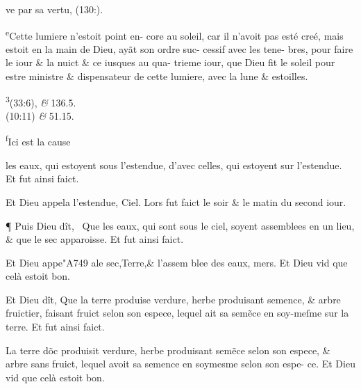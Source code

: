 \documentclass[twocolumn,paper=a4,pagesize=pdftex,12pt,headinclude=on]{scrbook}
\newcommand{\fakenote}[3][\space]{%
   \par\noindent#1\textsuperscript#2\justifying#3
}
\newcounter{verse}
\newcommand{\bverse}{%
  \addtocounter{verse}{1}
  \theverse\quad
}
\begin{document}
{{ ve par sa vertu, \linebreak
 (130:).}
   \fakenote{e}{Cette lumiere \linebreak
 n'estoit point en- \linebreak
 core au soleil, car \linebreak
 il n'avoit pas esté \linebreak
 creé, mais estoit en \linebreak
 la main de Dieu, \linebreak
 ay\~at son ordre suc- \linebreak
 cessif avec les tene- \linebreak
 bres, pour faire le \linebreak
 iour \& la nuict \& \linebreak
 ce iusques au qua- \linebreak
 trieme iour, que \linebreak
 Dieu fit le soleil \linebreak
 pour estre ministre \linebreak
 \& dispensateur de \linebreak
 cette lumiere, avec \linebreak
 la lune \& estoilles.}
   \fakenote{3}{(33:6), \textit\& 136.5.\\
                \bibleverse{Je}(10:11) \textit\& 51.15.}
   \fakenote{f}{Ici est la cause}
}
 \pagebreak

 \noindent les eaux, qui estoyent sous
 l'estendue, d'avec celles, qui estoyent sur l'esten\-due. Et fut ainsi faict.

\bverse Et Dieu appela l'estendue, Ciel.
 Lors fut faict le soir \& le matin du second iour.

\bverse ¶ Puis Dieu dît, 
 \footnotemarkverse{}~\footnotemark{}Que les eaux,
 qui sont sous le ciel,
 soyent assemblees en un lieu, \& que le sec apparoisse. Et fut ainsi faict.

\bverse Et Dieu appe\char"A749 ale sec,Terre,\& l'assem \linebreak
 blee des eaux, mers.
 Et Dieu vid que celà estoit bon.

\bverse Et Dieu dît, Que la terre produise verdure, herbe produisant semence,
 \& arbre fruictier, faisant fruict selon son espece, lequel ait sa sem\~ece
 en soy-meſ\-me sur la terre. Et fut ainsi faict.

\bverse La terre d\~oc produisit verdure, her\-be produisant sem\~ece
 selon son espece, \& arbre sans fruict, lequel avoit sa \linebreak
  semence en soymesme selon son espe- \linebreak
 ce. Et Dieu vid que celà estoit bon.
\end{document}
